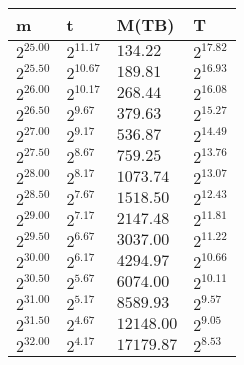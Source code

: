 \begin{tabular}{llll}
m & t & M(TB) & T \\ \hline
$2^{25.00}$ & $2^{11.17}$ & $134.22$ & $2^{17.82}$ \\
$2^{25.50}$ & $2^{10.67}$ & $189.81$ & $2^{16.93}$ \\
$2^{26.00}$ & $2^{10.17}$ & $268.44$ & $2^{16.08}$ \\
$2^{26.50}$ & $2^{9.67}$ & $379.63$ & $2^{15.27}$ \\
$2^{27.00}$ & $2^{9.17}$ & $536.87$ & $2^{14.49}$ \\
$2^{27.50}$ & $2^{8.67}$ & $759.25$ & $2^{13.76}$ \\
$2^{28.00}$ & $2^{8.17}$ & $1073.74$ & $2^{13.07}$ \\
$2^{28.50}$ & $2^{7.67}$ & $1518.50$ & $2^{12.43}$ \\
$2^{29.00}$ & $2^{7.17}$ & $2147.48$ & $2^{11.81}$ \\
$2^{29.50}$ & $2^{6.67}$ & $3037.00$ & $2^{11.22}$ \\
$2^{30.00}$ & $2^{6.17}$ & $4294.97$ & $2^{10.66}$ \\
$2^{30.50}$ & $2^{5.67}$ & $6074.00$ & $2^{10.11}$ \\
$2^{31.00}$ & $2^{5.17}$ & $8589.93$ & $2^{9.57}$ \\
$2^{31.50}$ & $2^{4.67}$ & $12148.00$ & $2^{9.05}$ \\
$2^{32.00}$ & $2^{4.17}$ & $17179.87$ & $2^{8.53}$ \\
\end{tabular}